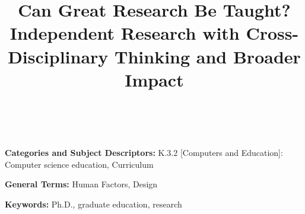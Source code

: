 \documentclass{sig-alternate-pretty}
\theoremstyle{plain}
\begin{document}
\title{Can Great Research Be Taught?  Independent Research
  with Cross-Disciplinary Thinking and Broader Impact}
 
\author{\hspace*{0.5in}{Nick Feamster and Alexander Gray} \\ \hspace{0.5in}}
 
\date{}
\maketitle

\begin{sloppypar}



\vspace{1mm}
\noindent
{\bf Categories and Subject Descriptors:} K.3.2 {[Computers and
    Education]}: {Computer science education, Curriculum}

\vspace{1mm}
\noindent
{\bf General Terms:} Human Factors, Design

\vspace{1mm}
\noindent
{\bf Keywords:} Ph.D., graduate education, research






 

\end{sloppypar}

\begin{small}


\end{small}
\end{document}

